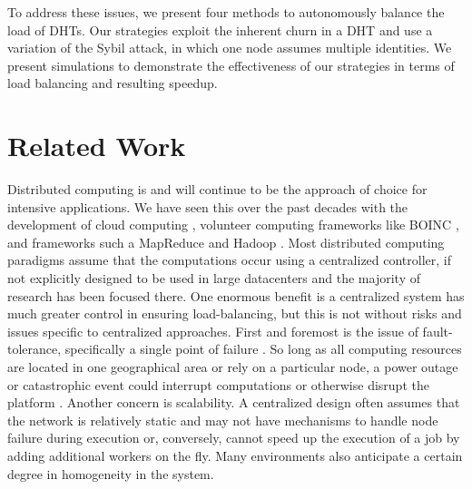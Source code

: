 \documentclass[10pt,conference]{IEEEtran}
\begin{document}

To address these issues, we present four methods to autonomously balance the load of DHTs. 
Our strategies exploit the inherent churn in a DHT and use a variation of the Sybil attack, in which one node assumes multiple identities. 
We present simulations to demonstrate the effectiveness of our strategies in terms of load balancing and resulting speedup.

\section{Related Work}



Distributed computing is and will continue to be the approach of choice for intensive applications.
We have seen this over the past decades with the development of cloud computing \cite{p2p-cloud}, volunteer computing frameworks like BOINC \cite{shvachko2010hadoop}, and frameworks such a MapReduce\cite{mapreduce} and Hadoop \cite{hadoop}.
Most distributed computing paradigms assume that the computations occur using a centralized controller, if not explicitly designed to be used in large datacenters \cite{hadoopAssumptions} and the majority of research has been focused there.
One enormous benefit is a centralized system has much greater control in ensuring load-balancing, but this is not without risks and issues specific to centralized approaches.
First and foremost is the issue of fault-tolerance, specifically a single point of failure \cite{shvachko2010hadoop}.
So long as all computing resources are located in one geographical area or rely on a particular node, a power outage or catastrophic event could interrupt computations or otherwise disrupt the platform \cite{babaoglu2014people}. Another concern is scalability.
A centralized design often assumes that the network is relatively static and may not have mechanisms to handle node failure during execution or, conversely, cannot speed up the execution of a job by adding additional workers on the fly.
Many environments also anticipate a certain degree in homogeneity in the system.
\end{document}
